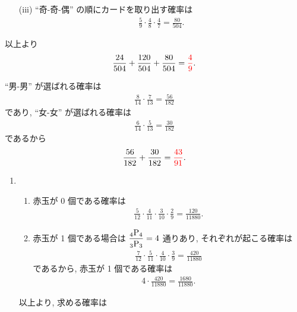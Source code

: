 \begin{qenumerate}
{\begin{enumerate}
{				\begin{align}
					\frac{4}{9}\cdot\frac{5}{8}\cdot\frac{3}{7} + \frac{5}{9}\cdot\frac{4}{8}\cdot\frac{3}{7} = \frac{120}{504}.
				\end{align}
			}
			\item[(iii)]{
				``奇-奇-偶'' の順にカードを取り出す確率は
				\begin{align}
					\frac{5}{9}\cdot\frac{4}{8}\cdot\frac{4}{7} = \frac{80}{504}.
				\end{align}
			}
		\end{enumerate}
		以上より
		\begin{align}
			\frac{24}{504} + \frac{120}{504} + \frac{80}{504} = \textcolor{red}{\frac{4}{9}}.
		\end{align}
	}
	\item{
		``男-男'' が選ばれる確率は
		\begin{align}
			\frac{8}{14}\cdot\frac{7}{13} = \frac{56}{182}
		\end{align}
		であり, ``女-女'' が選ばれる確率は
		\begin{align}
			\frac{6}{14}\cdot\frac{5}{13} = \frac{30}{182}
		\end{align}
		であるから
		\begin{align}
			\frac{56}{182} + \frac{30}{182} = \textcolor{red}{\frac{43}{91}}.
		\end{align}
	}
	\item{
		\begin{enumerate}
			\item{
				\begin{enumerate}
					\item{
						赤玉が 0 個である確率は
						\begin{align}
							\frac{5}{12}\cdot\frac{4}{11}\cdot\frac{3}{10}\cdot\frac{2}{9} = \frac{120}{11880}.
						\end{align}
					}
					\item{
						赤玉が 1 個である場合は $\dfrac{{{}_{4}\mathrm{P}_{4}}}{{{}_{3}\mathrm{P}_{3}}} = 4$ 通りあり, それぞれが起こる確率は
						\begin{align}
							\frac{7}{12}\cdot\frac{5}{11}\cdot\frac{4}{10}\cdot\frac{3}{9} = \frac{420}{11880}
						\end{align}
						であるから, 赤玉が 1 個である確率は
						\begin{align}
							4\cdot\frac{420}{11880} = \frac{1680}{11880}.
						\end{align}
					}
				\end{enumerate}
				以上より, 求める確率は
				\begin{align}

\end{align}}
\end{enumerate}}
\end{qenumerate}
